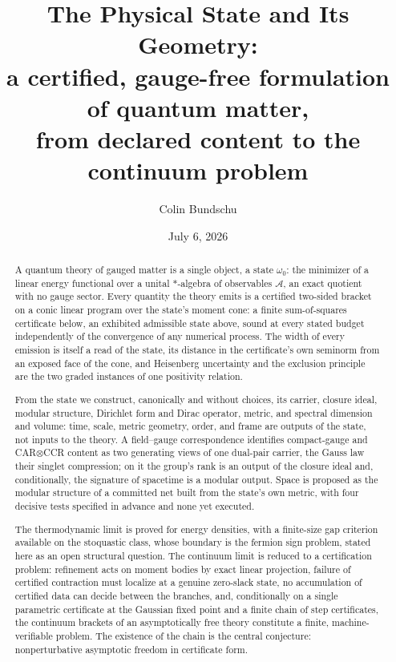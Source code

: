 \documentclass[11pt]{article}
\title{The Physical State and Its Geometry:\\
\large a certified, gauge-free formulation of quantum matter,\\
from declared content to the continuum problem}
\author{Colin Bundschu}
\date{July 6, 2026}
\theoremstyle{definition}
\theoremstyle{remark}
\newcommand{\A}{\mathcal{A}}
\newcommand{\w}{\omega_0}
\begin{document}
\maketitle

\begin{abstract}
A quantum theory of gauged matter is a single object, a state $\w$:
the minimizer of a linear energy functional over a unital $*$-algebra
of observables $\A$, an exact quotient with no gauge sector.  Every
quantity the theory emits is a certified two-sided bracket on a conic
linear program over the state's moment cone: a finite sum-of-squares
certificate below, an exhibited admissible state above, sound at every
stated budget independently of the convergence of any numerical
process.  The width of every emission is itself a read of the state,
its distance in the certificate's own seminorm from an exposed face of
the cone, and Heisenberg uncertainty and the exclusion principle are
the two graded instances of one positivity relation.

From the state we construct, canonically and without choices, its
carrier, closure ideal, modular structure, Dirichlet form and Dirac
operator, metric, and spectral dimension and volume: time, scale,
metric geometry, order, and frame are outputs of the state, not inputs
to the theory.  A field--gauge correspondence identifies compact-gauge
and CAR$\otimes$CCR content as two generating views of one dual-pair
carrier, the Gauss law their singlet compression; on it the group's
rank is an output of the closure ideal and, conditionally, the
signature of spacetime is a modular output.  Space is proposed as the
modular structure of a committed net built from the state's own
metric, with four decisive tests specified in advance and none yet
executed.

The thermodynamic limit is proved for energy densities, with a
finite-size gap criterion available on the stoquastic class, whose
boundary is the fermion sign problem, stated here as an open
structural question.  The continuum limit is reduced to a
certification problem: refinement acts on moment bodies by exact
linear projection, failure of certified contraction must localize at a
genuine zero-slack state, no accumulation of certified data can decide
between the branches, and, conditionally on a single parametric
certificate at the Gaussian fixed point and a finite chain of step
certificates, the continuum brackets of an asymptotically free theory
constitute a finite, machine-verifiable problem.  The existence of the
chain is the central conjecture: nonperturbative asymptotic freedom in
certificate form.


\end{abstract}
\end{document}

